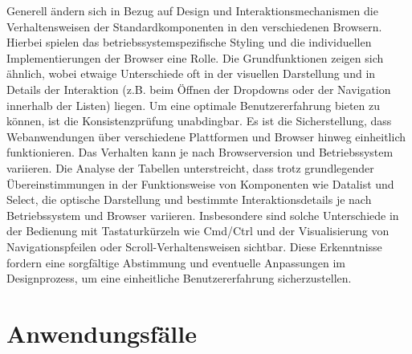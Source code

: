 Generell ändern sich in Bezug auf Design und Interaktionsmechanismen die Verhaltensweisen der Standardkomponenten in den verschiedenen Browsern. 
Hierbei spielen das betriebssystemspezifische Styling und die individuellen Implementierungen der Browser eine Rolle. 
Die Grundfunktionen zeigen sich ähnlich, wobei etwaige Unterschiede oft in der visuellen Darstellung und in Details der Interaktion (z.B. beim Öffnen der Dropdowns oder der Navigation innerhalb der Listen) liegen. 
Um eine optimale Benutzererfahrung bieten zu können, ist die Konsistenzprüfung unabdingbar.
Es ist die Sicherstellung, dass Webanwendungen über verschiedene Plattformen und Browser hinweg einheitlich funktionieren. 
Das Verhalten kann je nach Browserversion und Betriebssystem variieren. 
Die Analyse der Tabellen unterstreicht, dass trotz grundlegender Übereinstimmungen in der Funktionsweise von Komponenten wie Datalist und Select, 
die optische Darstellung und bestimmte Interaktionsdetails je nach Betriebssystem und Browser variieren. 
Insbesondere sind solche Unterschiede in der Bedienung mit Tastaturkürzeln wie Cmd/Ctrl und der Visualisierung von Navigationspfeilen oder Scroll-Verhaltensweisen sichtbar. 
Diese Erkenntnisse fordern eine sorgfältige Abstimmung und eventuelle Anpassungen im Designprozess, um eine einheitliche Benutzererfahrung sicherzustellen.


\section{Anwendungsfälle}
\label{sec:useCases}

